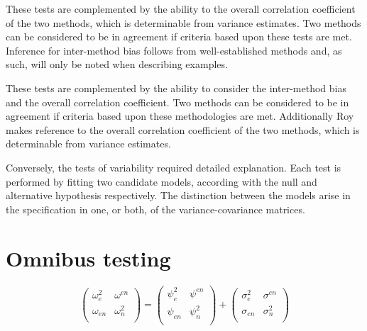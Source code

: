 \documentclass[12pt, a4paper]{report}
\theoremstyle{plain}
\theoremstyle{definition}
\theoremstyle{remark}
\begin{document}
These tests are complemented by the ability to the overall correlation coefficient of the two methods, which is determinable from variance estimates. Two methods can be considered to be in agreement if criteria based upon these tests are met. Inference for inter-method bias follows from well-established methods and, as such, will only be noted when describing examples.

These tests are complemented by the ability to consider the inter-method bias and the overall correlation coefficient.
Two methods can be considered to be in agreement if criteria based upon these methodologies are met. Additionally Roy makes reference to the overall correlation coefficient of the two methods, which is determinable from variance estimates.

Conversely, the tests of variability required detailed explanation. Each test is performed by fitting two candidate models, according with the null and alternative hypothesis respectively. The distinction between the models arise in the specification in one, or both, of the variance-covariance matrices. %


	
	

	\section{Omnibus testing}
	
	
	\begin{equation}
	\left( \begin{array}{cc}
	\omega^2_{e} & \omega^{en} \\
	\omega_{en} & \omega^2_{n} \\
	\end{array}\right)
	=
	\left( \begin{array}{cc}
	\psi^2_{e} & \psi^{en} \\
	\psi_{en} & \psi^2_{n} \\
	\end{array}\right)
	+
	\left( \begin{array}{cc}
	\sigma^2_{e} & \sigma^{en} \\
	\sigma_{en} & \sigma^2_{n} \\
	\end{array}\right)
	\end{equation}
	
	
\end{document}
